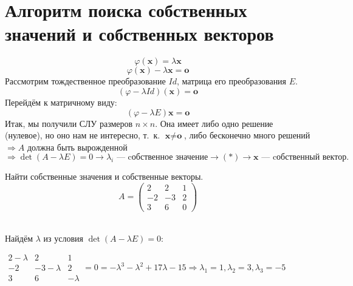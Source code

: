 \section{Алгоритм поиска собственных значений и собственных векторов}
\vspace{-0.5cm}
 $$\varphi(\textbf{x}) = \lambda \textbf{x}$$
 $$\varphi(\textbf{x}) - \lambda \textbf{x} = \textbf{o}$$
Рассмотрим тождественное преобразование $Id$, матрица его преобразования $E$. %
$$(\varphi -\lambda Id)(\textbf{x})=\textbf{o}$$
Перейдём к матричному виду:
\begin{equation}
(\varphi -\lambda E)\textbf{x}=\textbf{o} \tag{$*$}
\end{equation}
Итак, мы получили СЛУ размеров $n\times n$. Она имеет либо одно решение (нулевое), но оно нам не интересно, т.~к. $\textbf{x}\neq\textbf{o}$, либо бесконечно много решений $\Rightarrow A$ должна быть вырожденной $\Rightarrow \det(A-\lambda E) = 0 \rightarrow \lambda_i\text{ --- cобственное значение} \rightarrow (*) \rightarrow \textbf{x}\text{ --- cобственный вектор}.$ %
\begin{prim}
Найти собственные значения и собственные векторы.\\
$$A = \left( \begin{array}{rrr}
2 & 2 & 1  \\
-2 & -3& 2\\
3&6&0
\end{array}\right)
$$
\end{prim}\\

Найдём $\lambda$ из условия $\det(A-\lambda E) = 0$:

$\begin{array}{|ccc|}
    2-\lambda & 2 & 1  \\
    -2 & -3 -\lambda& 2\\
     3&6&-\lambda
\end{array} = 0 = -\lambda^3- \lambda^2+17\lambda -15 \Rightarrow \lambda_1 =1, \lambda_2 =3, \lambda_3 = -5$\\